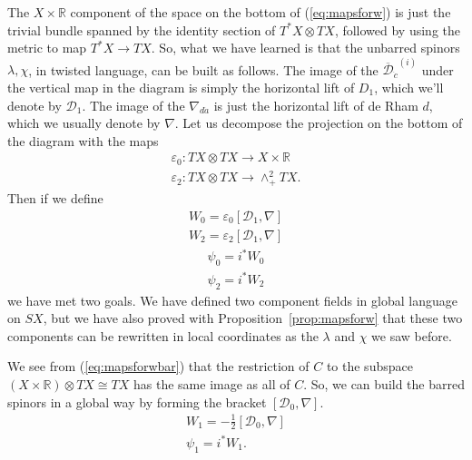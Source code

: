 \documentclass[twoside]{amsart}
\newcommand{\RR}{\ensuremath{\mathbb{R}}}
\renewcommand{\eqref}[1]{(\ref{eq:#1})}
\newcommand{\propref}[1]{Proposition~\ref{prop:#1}}
\renewcommand{\epsilon}{\varepsilon}
\newcommand{\enm}[1]{\ensuremath{#1}}
\renewcommand{\bar}[1]{\overline{#1}}
\newcommand{\onetwoij}[2]{\enm{#1^{(#2)}}}
\newcommand{\dievencov}[2]{\enm{\nabla_{#1\dot{#2}}}}
\newcommand{\odicjcov}[1]{\enm{\bar{\mathcal{D}}_{\dot{#1}}}}
\newcommand{\odijcjcov}[2]{\onetwoij{\odicjcov{#2}}{#1}}
\renewcommand{\epsilon}{\varepsilon}
\newcommand{\nab}{\enm{\nabla}}
\newcommand{\doc}{\enm{\mathcal{D}_{1}}}
\newcommand{\dzc}{\enm{\mathcal{D}_{0}}}
\begin{document}
The \( X\times\RR \) component of the space on the bottom of
\eqref{mapsforw} is just the
trivial bundle spanned by the identity section of \( T^{*}X\otimes TX
\), followed by using the metric to map \( T^{*}X\to TX \).  So, what
we have learned is that the unbarred spinors \(\lambda, \chi \), in twisted language,
can be built as follows.  The image of the \odijcjcov{i}{c} under the
vertical map in the diagram is simply the horizontal lift of \( D_{1}
\), which we'll denote by \doc.  The image of the \dievencov{d}{a} is
just the horizontal lift of de Rham \( d \), which
we usually denote by \nab.  Let us decompose the projection on the
bottom of the diagram with the maps
\begin{gather}
    \epsilon_{0}: TX\otimes TX\to X\times \RR \\
    \epsilon_{2}: TX\otimes TX\to \wedge^{2}_{+}TX.
\end{gather}
Then if we define
\begin{gather}
    W_{0} = \epsilon_{0}[\doc, \nab] \label{eq:w0}\\
    W_{2} = \epsilon_{2}[\doc, \nab] \label{eq:w2}
\end{gather}
\begin{gather}
    \psi_{0} = i^{*}W_{0} \label{eq:psi0}\\
    \psi_{2} = i^{*}W_{2} \label{eq:psi2}
\end{gather}
we have met two goals.  We have defined two component fields in
global
language on \( SX \), but we have also proved with \propref{mapsforw}
that these two
components can be rewritten in local coordinates as the \( \lambda \)
and \( \chi \) we saw before.

We see from \eqref{mapsforwbar} that the restriction of \( C \) to the
subspace \( (X\times\RR)\otimes TX\cong TX \) has the same image as
all of \( C \).  So, we can build the barred spinors in a global way
by forming the bracket \( [\dzc, \nab]. \)
\begin{gather}
    W_{1} = -\frac{1}{2}[\dzc, \nab]
    \label{eq:w1} \\
    \psi_{1} = i^{*}W_{1}
    \label{eq:psi1}.
\end{gather}
\end{document}
